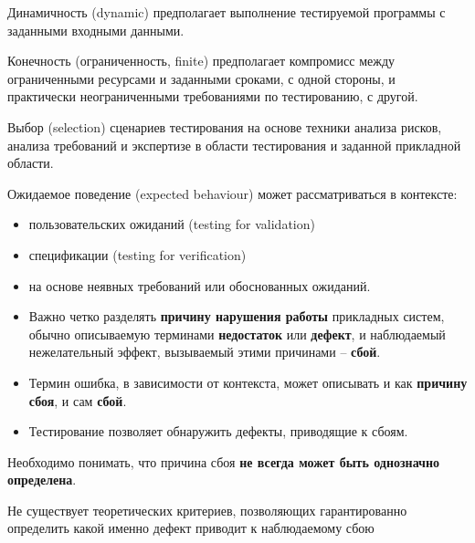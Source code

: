 \documentclass[xcolor=table]{beamer}
\begin{document}
\begin{frame}
	\linespread{0.8}
	\begin{block}{Динамичность (dynamic)}
		предполагает выполнение тестируемой программы с заданными входными данными.
	\end{block}
	\begin{block}{Конечность (ограниченность, finite)}
		предполагает компромисс между ограниченными ресурсами и заданными сроками, с одной стороны, и практически неограниченными требованиями по тестированию, с другой.
	\end{block}
	\begin{block}{Выбор (selection) сценариев тестирования}
		 на основе техники анализа рисков, анализа требований и экспертизе в области тестирования и заданной прикладной области.
	\end{block}
	\begin{block}{Ожидаемое поведение (expected behaviour)}
		может рассматриваться в контексте:
		\begin{itemize}
			\item пользовательских ожиданий (testing for validation)
			\item спецификации (testing for verification) 
			\item на основе неявных требований или обоснованных ожиданий.
		\end{itemize}		 
	\end{block}			
\end{frame}

\begin{frame}
	\linespread{1.0}
	\begin{itemize}
		\item Важно четко разделять \textbf{причину нарушения работы} прикладных систем, обычно описываемую терминами \textbf{недостаток} или \textbf{дефект}, и наблюдаемый нежелательный эффект, вызываемый этими причинами – \textbf{сбой}. 
		\item Термин ошибка, в зависимости от контекста, может описывать и как \textbf{причину сбоя}, и сам \textbf{сбой}. 
		\item Тестирование позволяет обнаружить дефекты, приводящие к сбоям.
	\end{itemize}		 
	Необходимо понимать, что причина сбоя \textbf{не всегда может быть однозначно определена}. 

	\medskip	
	
	Не существует теоретических критериев, позволяющих гарантированно определить какой именно дефект приводит к наблюдаемому сбою	
\end{frame}
\end{document}

